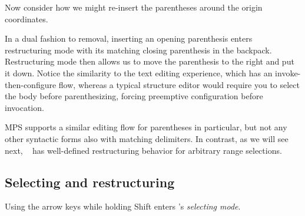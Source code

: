 Now consider how we might re-insert the parentheses
around the origin coordinates.


\noindent
In a dual fashion to removal, inserting
an opening parenthesis enters restructuring mode with its
matching closing parenthesis in the backpack.
Restructuring mode then allows us to move the parenthesis
to the right and put it down.
Notice the similarity to the text editing experience,
which has an invoke-then-configure flow, whereas a typical
structure editor would require you to select the body before
parenthesizing, forcing preemptive configuration before
invocation.

MPS supports a similar editing flow for parentheses in particular,
but not any other syntactic forms also with matching delimiters.
In contrast, as we will see next, \tylr~ has well-defined
restructuring behavior for arbitrary range selections.

\subsection{Selecting and restructuring} \label{sec:selecting-restructuring}

Using the arrow keys while holding
Shift enters \tylr's \emph{selecting mode}.

